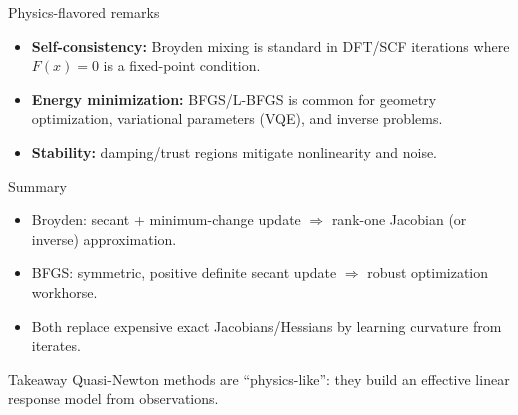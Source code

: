 \documentclass[aspectratio=169]{beamer}
\begin{document}
\begin{frame}{Physics-flavored remarks}
\begin{itemize}
\item \textbf{Self-consistency:} Broyden mixing is standard in DFT/SCF iterations where $F(x)=0$ is a fixed-point condition.
\item \textbf{Energy minimization:} BFGS/L-BFGS is common for geometry optimization, variational parameters (VQE), and inverse problems.
\item \textbf{Stability:} damping/trust regions mitigate nonlinearity and noise.
\end{itemize}
\end{frame}

\begin{frame}{Summary}
\begin{itemize}
\item Broyden: secant + minimum-change update $\Rightarrow$ rank-one Jacobian (or inverse) approximation.
\item BFGS: symmetric, positive definite secant update $\Rightarrow$ robust optimization workhorse.
\item Both replace expensive exact Jacobians/Hessians by learning curvature from iterates.
\end{itemize}

\begin{block}{Takeaway}
Quasi-Newton methods are ``physics-like'': they build an effective linear response model from observations.
\end{block}
\end{frame}
\end{document}
